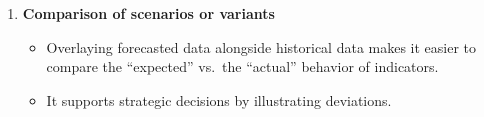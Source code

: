\documentclass[
  english,
  letterpaper,
  DIV=11,
  numbers=noendperiod]{scrreprt}
\providecommand{\tightlist}{%
  \setlength{\itemsep}{0pt}\setlength{\parskip}{0pt}}
\begin{document}
\begin{enumerate}
  \begin{itemize}
  \tightlist
  \item
    Tracking the use of resources (e.g.~staff, machines) across
    different projects or departments.\\
  \item
    It enables planning and balancing the workload.
  \end{itemize}
\item
  \textbf{Comparison of scenarios or variants}

  \begin{itemize}
  \tightlist
  \item
    Overlaying forecasted data alongside historical data makes it easier
    to compare the ``expected'' vs.~the ``actual'' behavior of
    indicators.\\
  \item
    It supports strategic decisions by illustrating deviations.
  \end{itemize}
\end{enumerate}
\end{document}
